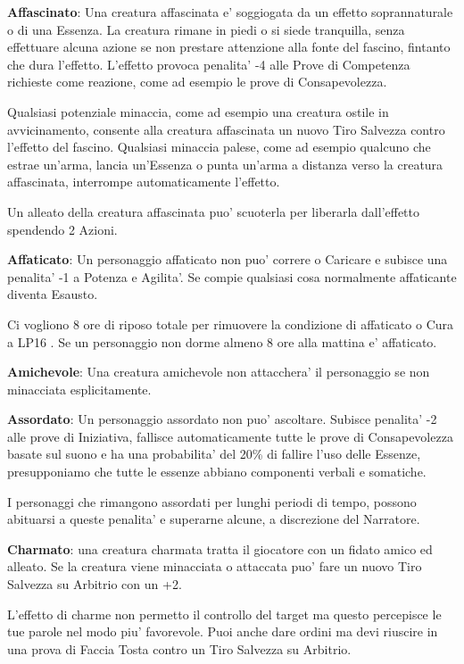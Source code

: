 \documentclass[a4paper,11pt,twoside,openany]{book}
\begin{document}
{\textbf{Affascinato}: Una creatura affascinata e' soggiogata da un effetto soprannaturale o di una Essenza. La creatura rimane in piedi o si siede tranquilla, senza effettuare alcuna azione se non prestare attenzione alla fonte del fascino, fintanto che dura l'effetto. L'effetto provoca penalita' -4 alle Prove di Competenza richieste come reazione, come ad esempio le prove di Consapevolezza. 

Qualsiasi potenziale minaccia, come ad esempio una creatura ostile in avvicinamento, consente alla creatura affascinata un nuovo Tiro Salvezza contro l'effetto del fascino. Qualsiasi minaccia palese, come ad esempio qualcuno che estrae un'arma, lancia un'Essenza o punta un'arma a distanza verso la creatura affascinata, interrompe automaticamente l'effetto. 

Un alleato della creatura affascinata puo' scuoterla per liberarla dall'effetto spendendo 2 Azioni.

\textbf{Affaticato}: Un personaggio affaticato non puo' correre o Caricare e subisce una penalita' -1 a Potenza e Agilita'. Se compie qualsiasi cosa normalmente affaticante diventa Esausto. 

Ci vogliono 8 ore di riposo totale per rimuovere la condizione di affaticato o Cura a LP16 . Se un personaggio non dorme almeno 8 ore alla mattina e' affaticato.

\textbf{Amichevole}: Una creatura amichevole non attacchera' il personaggio se non minacciata esplicitamente.

\textbf{Assordato}: Un personaggio assordato non puo' ascoltare. Subisce penalita' -2 alle prove di Iniziativa, fallisce automaticamente tutte le prove di Consapevolezza basate sul suono e ha una probabilita' del 20\% di fallire l'uso delle Essenze, presupponiamo che tutte le essenze abbiano componenti verbali e somatiche.

I personaggi che rimangono assordati per lunghi periodi di tempo, possono abituarsi a queste penalita' e superarne alcune, a discrezione del Narratore.

\textbf{Charmato}: una creatura charmata tratta il giocatore con un fidato amico ed alleato. Se la creatura viene minacciata o attaccata puo' fare un nuovo Tiro Salvezza su Arbitrio con un +2.

L'effetto di charme non permetto il controllo del target ma questo percepisce le tue parole nel modo piu' favorevole. Puoi anche dare ordini ma devi riuscire in una prova di Faccia Tosta contro un Tiro Salvezza su Arbitrio.

}
\end{document}
